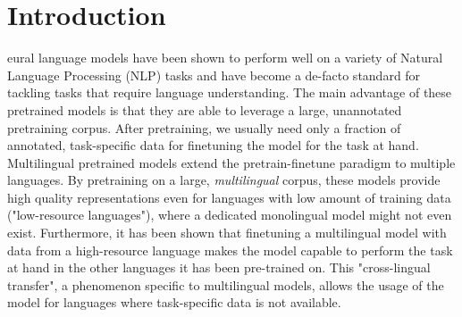 
\chapter{Introduction}





eural language models have been shown to perform well on a variety of Natural Language Processing (NLP) tasks and have become a de-facto standard for tackling tasks that require language understanding. The main advantage of these pretrained models is that they are able to leverage a large, unannotated pretraining corpus. After pretraining, we usually need only a fraction of annotated, task-specific data for finetuning the model for the task at hand. \cite{devlin_bert_2019,radford_improving_nodate} Multilingual pretrained models extend the pretrain-finetune paradigm to multiple languages. By pretraining on a large, \textit{multilingual} corpus, these models provide high quality representations even for languages with low amount of training data ("low-resource languages"), where a dedicated monolingual model might not even exist. Furthermore, it has been shown that finetuning a multilingual model with data from a high-resource language makes the model capable to perform the task at hand in the other languages it has been pre-trained on. This "cross-lingual transfer", a phenomenon specific to multilingual models, allows the usage of the model for languages where task-specific data is not available. \cite{k_cross-lingual_2022,conneau_unsupervised_2020-1}

